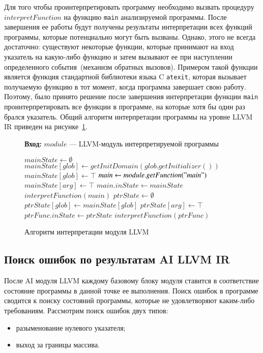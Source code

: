 Для того чтобы проинтерпретировать программу необходимо вызвать процедуру 
$interpretFunction$ на функцию \texttt{main} анализируемой программы. После 
завершения ее работы будут получены результаты интерпретации всех функций
программы, которые потенциально могут быть вызваны. Однако, этого не всегда
достаточно: существуют некоторые функции, которые принимают на вход указатель
на какую-либо функцию и затем вызывают ее при наступлении определенного 
события~(механизм обратных вызовов). Примером такой функции является функция
стандартной библиотеки языка C \texttt{atexit}, которая вызывает получаемую 
функцию в тот момент, когда программа завершает свою работу. Поэтому, было
принято решение после завершения интерпретации функции \texttt{main}
проинтерпретировать все функции в программе, на которые хотя бы один раз
брался указатель. Общий алгоритм интерпретации программы на уровне LLVM IR 
приведен на рисунке~\ref{image:irInterpretation}.
\begin{figure}[h!]
\textbf{Вход:} $module$ --- LLVM-модуль интерпретируемой программы

\begin{algorithmic}[1]
\State $mainState \gets \emptyset$
        \State $mainState[glob] \gets getInitDomain(glob.getInitializer())$
    \Else
        \State $mainState[glob] \gets \top$
    \EndIf
\EndFor
\State $main \gets module.getFunction("main")$
    \State $mainState[arg] \gets \top$
\EndFor
\State $main.inState \gets mainState$
\State $interpretFunction(main)$
    \State $ptrState \gets \emptyset$
        \State $ptrState[glob] \gets mainState[glob]$
    \EndFor
        \State $ptrState[arg] \gets \top$
    \EndFor
    \State $ptrFunc.inState \gets ptrState$
    \State $interpretFunction(ptrFunc)$
\EndFor
\end{algorithmic}
\caption{Алгоритм интерпретации модуля LLVM}
\label{image:irInterpretation}
\end{figure}

\subsection{Поиск ошибок по результатам AI LLVM IR}
После AI модуля LLVM каждому базовому блоку модуля ставится в соответствие
состояние программы в данной точке ее выполнения. Поиск ошибок в программе
сводится к поиску состояний программы, которые не удовлетворяют каким-либо
требованиям. Рассмотрим поиск ошибок двух типов:
\begin{itemize}
\item разыменование нулевого указателя;
\item выход за границы массива.
\end{itemize}

